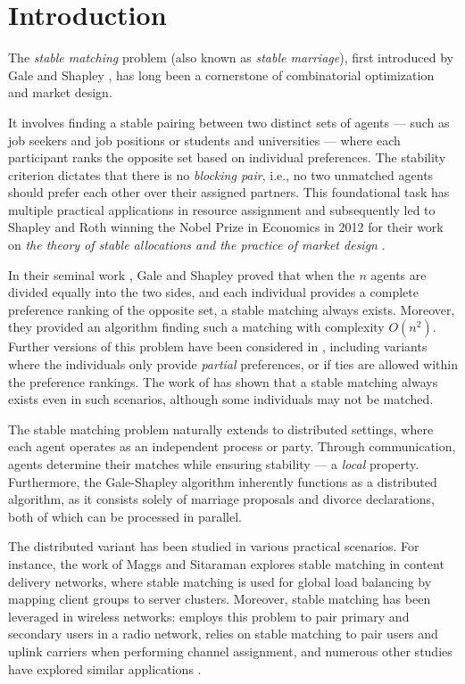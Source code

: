 \section{Introduction}

The \emph{stable matching} problem (also known as \emph{stable marriage}), first introduced by Gale and Shapley \cite{GaleShapley}, has long been a cornerstone of combinatorial optimization and market design. 

It involves finding a stable pairing between two distinct sets of agents --- such as job seekers and job positions or students and universities --- where each participant ranks the opposite set based on individual preferences. The stability criterion dictates that there is no \emph{blocking pair}, i.e., no two unmatched agents should prefer each other over their assigned partners. This foundational task has multiple practical applications in resource assignment and subsequently led to Shapley and Roth winning the Nobel Prize in Economics in 2012 for their work on \textit{the theory of stable allocations and the practice of market design} \cite{ShapleyRoth}.


In their seminal work \cite{GaleShapley}, Gale and Shapley proved that when the $n$ agents are divided equally into the two sides, and each individual provides a complete preference ranking of the opposite set, a stable matching always exists. Moreover, they provided an algorithm finding such a matching with complexity $O(n^2)$. Further versions of this problem have been considered in \cite{GusfieldIrving}, including variants where the individuals only provide \emph{partial} preferences, or if ties are allowed within the preference rankings. The work of \cite{GusfieldIrving} has shown that a stable matching always exists even in such scenarios, although some individuals may not be matched. 


 The stable matching problem naturally extends to distributed settings, where each agent operates as an independent process or party. Through communication, agents determine their matches while ensuring stability --- a \emph{local} property. 
Furthermore, the Gale-Shapley algorithm inherently functions as a distributed algorithm, as it consists solely of marriage proposals and divorce declarations, both of which can be processed in parallel.

The distributed variant has been studied in various practical scenarios. For instance, the work of Maggs and Sitaraman \cite{MaSi15} explores stable matching in content delivery networks, where stable matching is used for global load balancing by mapping client groups to server clusters. Moreover, stable matching has been leveraged in wireless networks: \cite{BaLoLi11} employs this problem to pair primary and secondary users in a radio network, \cite{ElAhDa12} 
relies on stable matching to pair users and uplink carriers when performing channel assignment, and numerous other studies have explored similar applications \cite{GuZhPa15, BaLoHa12, PaBeSa13}.



